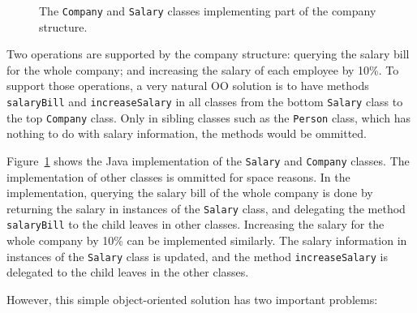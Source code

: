 \begin{figure}[tb]
\vspace{-.1in}
\caption{The \lstinline{Company} and \lstinline{Salary} classes
  implementing part of the company structure.}
\label{oop_company}
\end{figure}

Two operations are supported by the company structure: querying the
salary bill for the whole company; and increasing the salary of each
employee by 10\%. To support those operations, a very natural OO
solution is to have methods \lstinline{salaryBill} and
\lstinline{increaseSalary} in all classes from the bottom
\lstinline{Salary} class to the top \lstinline{Company} class. Only in
sibling classes such as the \lstinline{Person} class, which has
nothing to do with salary information, the methods would be ommitted.

Figure~\ref{oop_company} shows the Java implementation of the  
\lstinline{Salary} and \lstinline{Company} classes. The implementation 
of other classes is ommitted for space reasons.
In the implementation, querying the salary bill of the whole company is done
by returning the salary in instances of the \lstinline{Salary} class,
and delegating the method \lstinline{salaryBill} to the child leaves
in other classes. Increasing the salary for the whole
company by 10\% can be implemented similarly. The salary information
in instances of the \lstinline{Salary} class is updated, and the
method \lstinline{increaseSalary} is delegated to the child leaves in
the other classes.

However, this simple object-oriented solution has two important problems:

